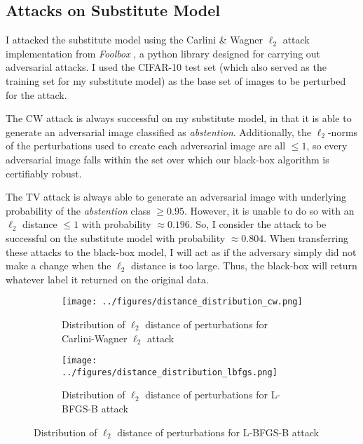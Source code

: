\documentclass{article}
\begin{document}
\subsection{Attacks on Substitute Model}
I attacked the substitute model using the Carlini \& Wagner $\ell_2$ attack implementation from \textit{Foolbox} \cite{RBB17}, a python library designed for carrying out adversarial attacks. I used the CIFAR-10 test set (which also served as the training set for my substitute model) as the base set of images to be perturbed for the attack. \newline

The CW attack is always successful on my substitute model, in that it is able to generate an adversarial image classified as \textit{abstention}. Additionally, the $\ell_2$-norms of the perturbations used to create each adversarial image are all $\leq 1$, so every adversarial image falls within the set over which our black-box algorithm is certifiably robust. \newline

The TV attack is always able to generate an adversarial image with underlying probability of the \textit{abstention} class $\geq 0.95$. However, it is unable to do so with an $\ell_2$ distance $\leq 1$ with probability $\approx 0.196$. So, I consider the attack to be successful on the substitute model with probability $\approx 0.804$. When transferring these attacks to the black-box model, I will act as if the adversary simply did not make a change when the $\ell_2$ distance is too large. Thus, the black-box will return whatever label it returned on the original data.

\begin{figure}[H]
    \begin{subfigure}{.5\textwidth}
        \centering
        \texttt{[image: ../figures/distance\_distribution\_cw.png]}
        \caption{Distribution of $\ell_2$ distance of perturbations for Carlini-Wagner $\ell_2$ attack}
        \label{fig:distance_distribution}
    \end{subfigure}
    \begin{subfigure}{.5\textwidth}
        \centering
        \texttt{[image: ../figures/distance\_distribution\_lbfgs.png]}
        \caption{Distribution of $\ell_2$ distance of perturbations for L-BFGS-B attack}
        \label{fig:distance_distribution}
    \end{subfigure}
\end{figure}
\end{document}
